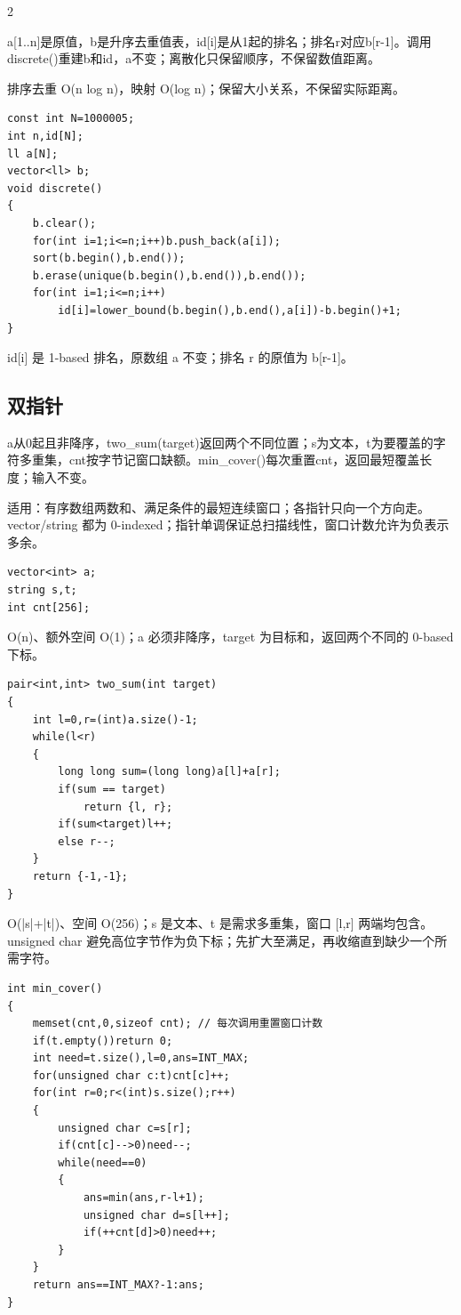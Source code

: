 \documentclass[UTF8,fontset=fandol,a4paper,twoside]{ctexart}
\newcommand{\note}[1]{{\fontsize{10}{12}\selectfont #1\par}}
\begin{document}
\begin{multicols}{2}
\note{a[\allowbreak{}1.\allowbreak{}.\allowbreak{}n]\allowbreak{}是原值，b是升序去重值表，id[\allowbreak{}i]\allowbreak{}是从1起的排名；排名r对应b[\allowbreak{}r-\allowbreak{}1]\allowbreak{}。调用discrete(\allowbreak{})\allowbreak{}重建b和id，a不变；离散化只保留顺序，不保留数值距离。}
\note{排序去重 O(\allowbreak{}n log n)\allowbreak{}，映射 O(\allowbreak{}log n)\allowbreak{}；保留大小关系，不保留实际距离。}
\begin{lstlisting}
const int N=1000005;
int n,id[N];
ll a[N];
vector<ll> b;
void discrete()
{
    b.clear();
    for(int i=1;i<=n;i++)b.push_back(a[i]);
    sort(b.begin(),b.end());
    b.erase(unique(b.begin(),b.end()),b.end());
    for(int i=1;i<=n;i++)
        id[i]=lower_bound(b.begin(),b.end(),a[i])-b.begin()+1;
}
\end{lstlisting}
\note{id[\allowbreak{}i]\allowbreak{} 是 1-\allowbreak{}based 排名，原数组 a 不变；排名 r 的原值为 b[\allowbreak{}r-\allowbreak{}1]\allowbreak{}。}
\subsection{双指针}

\note{a从0起且非降序，two\_sum(\allowbreak{}target)\allowbreak{}返回两个不同位置；s为文本，t为要覆盖的字符多重集，cnt按字节记窗口缺额。min\_cover(\allowbreak{})\allowbreak{}每次重置cnt，返回最短覆盖长度；输入不变。}
\note{适用：有序数组两数和、满足条件的最短连续窗口；各指针只向一个方向走。 vector/\allowbreak{}string 都为 0-\allowbreak{}indexed；指针单调保证总扫描线性，窗口计数允许为负表示多余。}
\begin{lstlisting}
vector<int> a;
string s,t;
int cnt[256];
\end{lstlisting}
\note{O(\allowbreak{}n)\allowbreak{}、额外空间 O(\allowbreak{}1)\allowbreak{}；a 必须非降序，target 为目标和，返回两个不同的 0-\allowbreak{}based 下标。}
\begin{lstlisting}
pair<int,int> two_sum(int target)
{
    int l=0,r=(int)a.size()-1;
    while(l<r)
    {
        long long sum=(long long)a[l]+a[r];
        if(sum == target)
            return {l, r};
        if(sum<target)l++;
        else r--;
    }
    return {-1,-1};
}
\end{lstlisting}
\note{O(\allowbreak{}|s|+\allowbreak{}|t|)\allowbreak{}、空间 O(\allowbreak{}256)\allowbreak{}；s 是文本、t 是需求多重集，窗口 [\allowbreak{}l,\allowbreak{}r]\allowbreak{} 两端均包含。 unsigned char 避免高位字节作为负下标；先扩大至满足，再收缩直到缺少一个所需字符。}
\begin{lstlisting}
int min_cover()
{
    memset(cnt,0,sizeof cnt); // 每次调用重置窗口计数
    if(t.empty())return 0;
    int need=t.size(),l=0,ans=INT_MAX;
    for(unsigned char c:t)cnt[c]++;
    for(int r=0;r<(int)s.size();r++)
    {
        unsigned char c=s[r];
        if(cnt[c]-->0)need--;
        while(need==0)
        {
            ans=min(ans,r-l+1);
            unsigned char d=s[l++];
            if(++cnt[d]>0)need++;
        }
    }
    return ans==INT_MAX?-1:ans;
}
\end{lstlisting}

\end{multicols}
\end{document}
